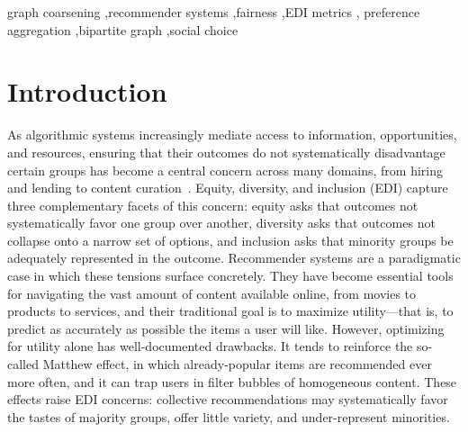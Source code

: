 \documentclass[a4paper,fleqn]{cas-dc}
\begin{document}



\begin{keywords}
graph coarsening \sep recommender systems \sep fairness \sep EDI metrics \sep
preference aggregation \sep bipartite graph \sep social choice
\end{keywords}

\maketitle

\section{Introduction}
%

As algorithmic systems increasingly mediate access to information, opportunities,
and resources, ensuring that their outcomes do not systematically disadvantage
certain groups has become a central concern across many domains, from hiring and
lending to content curation~\cite{mehrabi2021survey}. Equity, diversity, and
inclusion (EDI) capture three complementary facets of this concern: equity asks
that outcomes not systematically favor one group over another, diversity asks that
outcomes not collapse onto a narrow set of options, and inclusion asks that
minority groups be adequately represented in the outcome. Recommender systems
are a paradigmatic case in which these tensions surface concretely. They have
become essential tools for navigating the vast amount of content available online,
from movies to products to services, and their traditional goal is to maximize
utility—that is, to predict as accurately as possible the items a user will
like. However, optimizing for utility alone has well-documented drawbacks. It
tends to reinforce the so-called Matthew effect, in which already-popular items
are recommended ever more often, and it can trap users in filter bubbles of
homogeneous content. These effects raise EDI concerns: collective recommendations
may systematically favor the tastes of majority groups, offer little variety, and
under-represent minorities.
\end{document}
